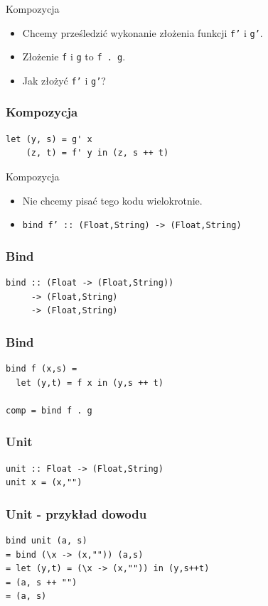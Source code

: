 \documentclass[14pt]{beamer}
\begin{document}
\begin{frame}{Kompozycja}
    \begin{itemize}
        \item Chcemy prześledzić wykonanie złożenia funkcji \texttt{f'}
            i \texttt{g'}.
        \item Złożenie \texttt{f} i \texttt{g} to \texttt{f . g}.
        \item Jak złożyć \texttt{f'} i \texttt{g'}?
    \end{itemize}
\end{frame}

\begin{frame}[fragile]
\frametitle{Kompozycja}
\begin{verbatim}
let (y, s) = g' x
    (z, t) = f' y in (z, s ++ t)
\end{verbatim}
\end{frame}

\begin{frame}{Kompozycja}
    \begin{itemize}
        \item Nie chcemy pisać tego kodu wielokrotnie.
        \item \texttt{bind f' :: (Float,String) -> (Float,String)}
    \end{itemize}
\end{frame}

\begin{frame}[fragile]
\frametitle{Bind}
\begin{verbatim}
bind :: (Float -> (Float,String))
     -> (Float,String)
     -> (Float,String)
\end{verbatim}
\end{frame}

\begin{frame}[fragile]
\frametitle{Bind}
\begin{verbatim}
bind f (x,s) =
  let (y,t) = f x in (y,s ++ t)

comp = bind f . g
\end{verbatim}
\end{frame}

\begin{frame}[fragile]
\frametitle{Unit}
\begin{verbatim}
unit :: Float -> (Float,String)
unit x = (x,"")
\end{verbatim}
\end{frame}

\begin{frame}[fragile]
\frametitle{Unit - przykład dowodu}
\begin{verbatim}
bind unit (a, s)
= bind (\x -> (x,"")) (a,s)
= let (y,t) = (\x -> (x,"")) in (y,s++t)
= (a, s ++ "")
= (a, s)
\end{verbatim}
\end{frame}
\end{document}
